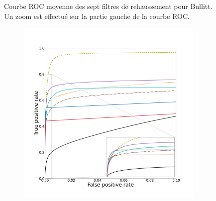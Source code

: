\begin{figure}[!ht]
\begin{subfigure}[t]{0.2\textwidth}
  \end{subfigure}
  \caption{Courbe ROC moyenne des sept filtres de rehaussement pour Bullitt. Un zoom est effectué sur la partie gauche de la courbe ROC.}
\end{figure}

\begin{figure}[!ht]
  \begin{subfigure}[t]{0.78\textwidth}
    \centering
  \includegraphics[clip = true, trim  =  125 125 100 200, height=9cm]{Images/Vascu_2_ROC.pdf}
\end{subfigure}
\begin{subfigure}[t]{0.2\textwidth}

\end{subfigure}
\end{figure}
